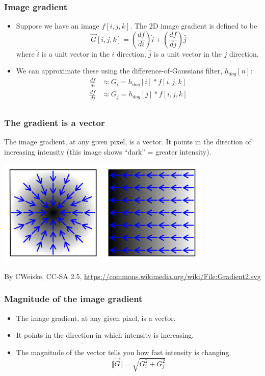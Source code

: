\documentclass{beamer}
\begin{document}
\begin{frame}
  \frametitle{Image gradient}
  \begin{itemize}
  \item Suppose we have an image $f[i,j,k]$.  The 2D image gradient is
    defined to be
    \[
    \vec{G}[i,j,k] = \left(\frac{df}{di}\right)\hat{i} + \left(\frac{df}{dj}\right)\hat{j}
    \]
    where $\hat{i}$ is a unit vector in the $i$ direction, $\hat{j}$
    is a unit vector in the $j$ direction.
  \item We can approximate these using the difference-of-Gaussians filter, $h_{dog}[n]$:
    \begin{align*}
      \frac{df}{di} &\approx G_i = h_{dog}[i]\ast f[i,j,k]\\
      \frac{df}{dj} &\approx G_j = h_{dog}[j]\ast f[i,j,k]\\
    \end{align*}
  \end{itemize}
\end{frame}
\begin{frame}
  \frametitle{The gradient is a vector}
  The image gradient, at any given pixel, is a vector.  It  points in the direction of
  increasing intensity (this image shows ``dark'' = greater intensity).
  \centerline{\includegraphics[height=2in]{gradient.png}}
  \begin{tiny}
    By CWeiske, CC-SA 2.5,
    \url{https://commons.wikimedia.org/wiki/File:Gradient2.svg}
  \end{tiny}
\end{frame}
      
\begin{frame}
  \frametitle{Magnitude of the image gradient}
  \begin{itemize}
  \item
    The image gradient, at any given pixel, is a vector.
  \item
    It points in the direction in which intensity is increasing.
  \item
    The magnitude of the vector tells you how fast intensity is
    changing.
    \[
    \Vert \vec{G}\Vert =\sqrt{G_i^2 + G_j^2}
    \]
  \end{itemize}
\end{frame}
    
\end{document}
